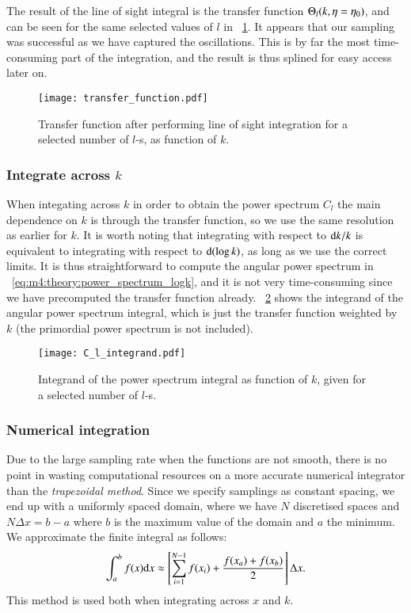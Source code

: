         The result of the line of sight integral is the transfer function $\Theta_l(k, \eta=\eta_0)$, and can be seen for the same selected values of $l$ in ~\cref{fig:m4:transfer_function}. It appears that our sampling was successful as we have captured the oscillations. This is by far the most time-consuming part of the integration, and the result is thus splined for easy access later on. 
        \begin{figure}
            \texttt{[image: transfer\_function.pdf]}
            \caption{Transfer function after performing line of sight integration for a selected number of $l$-s, as function of $k$. }
            \label{fig:m4:transfer_function}
        \end{figure}

    \subsubsection{Integrate across $k$}
        When integating across $k$ in order to obtain the power spectrum $C_l$ the main dependence on $k$ is through the transfer function, so we use the same resolution as earlier for $k$. It is worth noting that integrating with respect to $\mathrm{d} k/k$ is equivalent to integrating with respect to $\mathrm{d}(\log{k})$, as long as we use the correct limits. It is thus straightforward to compute the angular power spectrum in ~\cref{eq:m4:theory:power_spectrum_logk}, and it is not very time-consuming since we have precomputed the transfer function already. ~\cref{fig:m4:C_l_integrand} shows the integrand of the angular power spectrum integral, which is just the transfer function weighted by $k$ (the primordial power spectrum is not included). 
        \begin{figure}
            \texttt{[image: C\_l\_integrand.pdf]}
            \caption{Integrand of the power spectrum integral as function of $k$, given for a selected number of $l$-s.}
            \label{fig:m4:C_l_integrand}
        \end{figure}


    \subsubsection{Numerical integration}
        Due to the large sampling rate when the functions are not smooth, there is no point in wasting computational resources on a more accurate numerical integrator than the \textit{trapezoidal method}. Since we specify samplings as constant spacing, we end up with a uniformly spaced domain, where we have $N$ discretised spaces and $N\Delta x= b-a$ where $b$ is the maximum value of the domain and $a$ the minimum. We approximate the finite integral as follows:
        \begin{equation}
            \int_a^bf(x)\mathrm{d} x \approx \left[ \sum_{i=1}^{N-1}f(x_i) + \frac{f(x_a)+f(x_b)}{2} \right]\Delta x.
        \end{equation}
        This method is used both when integrating across $x$ and $k$. 


